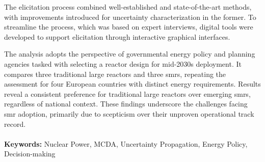 \documentclass{polimi_template_classic/PoliMi3i_thesis}
\begin{document}
The elicitation process combined well-established and state-of-the-art methods, with improvements introduced for uncertainty characterization in the former. To streamline the process, which was based on expert interviews, digital tools were developed to support elicitation through interactive graphical interfaces.

The analysis adopts the perspective of governmental energy policy and planning agencies tasked with selecting a reactor design for mid-2030s deployment. It compares three traditional large reactors and three \glspl{smr}, repeating the assessment for four European countries with distinct energy requirements. Results reveal a consistent preference for traditional large reactors over emerging \glspl{smr}, regardless of national context. These findings underscore the challenges facing \gls{smr} adoption, primarily due to scepticism over their unproven operational track record.
\\
\\
\textbf{Keywords:} Nuclear Power, MCDA, Uncertainty Propagation, Energy Policy, Decision-making %


\thispagestyle{empty}
\tableofcontents %
\thispagestyle{empty}
\cleardoublepage

%
%
%    
%

\mainmatter %
\end{document}
